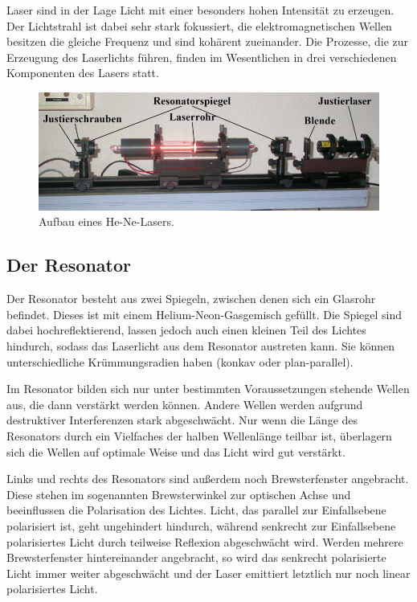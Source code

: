 Laser sind in der Lage Licht mit einer besonders hohen Intensität zu erzeugen. Der Lichtstrahl ist dabei sehr stark fokussiert,
die elektromagnetischen Wellen besitzen die gleiche Frequenz und sind kohärent zueinander. Die Prozesse, die zur
Erzeugung des Laserlichts führen, finden im Wesentlichen in drei verschiedenen Komponenten des Lasers statt.

\begin{figure}
\centering
\includegraphics[width=\textwidth]{laseraufbau.png}
\caption{Aufbau eines He-Ne-Lasers.\cite[3]{anleitung}}
\label{fig:laseraufbau}
\end{figure}

\subsection{Der Resonator}

Der Resonator besteht aus zwei Spiegeln, zwischen denen sich ein Glasrohr befindet. Dieses ist mit einem Helium-Neon-Gasgemisch
gefüllt. Die Spiegel sind dabei hochreflektierend, lassen jedoch auch einen kleinen Teil des Lichtes hindurch, sodass das
Laserlicht aus dem Resonator austreten kann. Sie können unterschiedliche Krümmungsradien haben (konkav oder plan-parallel).

Im Resonator bilden sich nur unter bestimmten Voraussetzungen stehende Wellen aus, die dann verstärkt werden können.
Andere Wellen werden aufgrund destruktiver Interferenzen stark abgeschwächt. Nur wenn die Länge des Resonators durch ein
Vielfaches der halben Wellenlänge teilbar ist, überlagern sich die Wellen auf optimale Weise und das Licht wird gut verstärkt.

Links und rechts des Resonators sind außerdem noch Brewsterfenster angebracht. Diese stehen im sogenannten Brewsterwinkel
zur optischen Achse und beeinflussen die Polarisation des Lichtes. Licht, das parallel zur Einfallsebene polarisiert ist,
geht ungehindert hindurch, während senkrecht zur Einfallsebene polarisiertes Licht durch teilweise Reflexion abgeschwächt wird.
Werden mehrere Brewsterfenster hintereinander angebracht, so wird das senkrecht polarisierte Licht immer weiter abgeschwächt 
und der Laser emittiert letztlich nur noch linear polarisiertes Licht.

